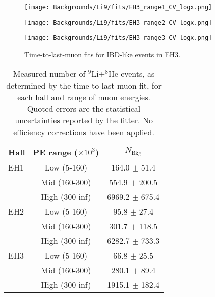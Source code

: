 \documentclass[../thesis.tex]{subfiles}
\begin{document}
\begin{figure}[ht]
  \texttt{[image: Backgrounds/Li9/fits/EH3\_range1\_CV\_logx.png]} \\[0.5em]
  \begin{minipage}{0.5\textwidth}%
    \texttt{[image: Backgrounds/Li9/fits/EH3\_range2\_CV\_logx.png]}%
  \end{minipage}%
  \begin{minipage}{0.5\textwidth}%
    \texttt{[image: Backgrounds/Li9/fits/EH3\_range3\_CV\_logx.png]}%
  \end{minipage}%
  \caption{Time-to-last-muon fits for IBD-like events in EH3.}
  \label{fig:li9_fits_eh3}
\end{figure}

\begin{table}[h]
  \centering
  \begin{tabular}{lcc}
    \toprule
    Hall & PE range ($\times10^3$) & $N_{\mathrm{Bkg}}$ \\
    \midrule
    EH1  & Low (5-160)   & 164.0 $\pm$ 51.4 \\
         & Mid (160-300) & 554.9 $\pm$ 200.5 \\
         & High (300-inf) & 6969.2 $\pm$ 675.4 \\
    \midrule
    EH2  & Low (5-160)   & 95.8 $\pm$ 27.4 \\
         & Mid (160-300) & 301.7 $\pm$ 118.5 \\
         & High (300-inf) & 6282.7 $\pm$ 733.3 \\
    \midrule
    EH3  & Low (5-160)   & 66.8 $\pm$ 25.5 \\
         & Mid (160-300) & 280.1 $\pm$ 89.4 \\
         & High (300-inf) & 1915.1 $\pm$ 182.4 \\
    \bottomrule
  \end{tabular}
  \caption{Measured number of $^9$Li+$^8$He events, as determined by the time-to-last-muon fit, for each hall and range of muon energies. Quoted errors are the statistical uncertainties reported by the fitter. No efficiency corrections have been applied.}
  \label{tab:bkgLi9Rates}
\end{table}
\end{document}
